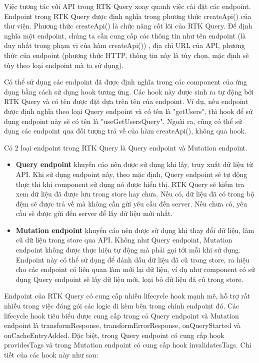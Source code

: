 \tab \tab Việc tương tác với API trong RTK Query xoay quanh việc cài đặt các endpoint.
Endpoint trong RTK Query được định nghĩa trong phương thức createApi() của thư viện.
Phương thức createApi() là chức năng cốt lõi của RTK Query.
Để định nghĩa một endpoint, chúng ta cần cung cấp các thông tin như tên endpoint (là duy nhất trong phạm vi của hàm createApi()) , địa chỉ URL của API, phương thức của endpoint (phương thức HTTP, thông tin này là tùy chọn, mặc định sẽ tùy theo loại endpoint mà ta sử dụng).

Có thể sử dụng các endpoint đã được định nghĩa trong các component của ứng dụng bằng cách sử dụng hook tương ứng.
Các hook này được sinh ra tự động bởi RTK Query và có tên được đặt dựa trên tên của endpoint.
Ví dụ, nếu endpoint được định nghĩa theo loại Query endpoint và có tên là "getUsers", thì hook để sử dụng endpoint này sẽ có tên là "useGetUsersQuery".
Ngoài ra, cũng có thể sử dụng các endpoint  qua đối tượng trả về của hàm createApi(), không qua hook.

Có 2 loại endpoint trong RTK Query là Query endpoint và Mutation endpoint.

\begin{itemize}
      \item \textbf{Query endpoint} khuyến cáo nên được sử dụng khi lấy, truy xuất dữ liệu từ API.
            Khi sử dụng endpoint này, theo mặc định, Query endpoint sẽ tự động thực thi khi component sử dụng nó được hiển thị.
            RTK Query sẽ kiểm tra xem dữ liệu đã được lưu trong store hay chưa.
            Nếu có, dữ liệu đã có trong bộ đệm sẽ được trả về mà không cần gửi yêu cầu đến server.
            Nếu chưa có, yêu cầu sẽ được gửi đến server để lấy dữ liệu mới nhất.
      \item \textbf{Mutation endpoint} khuyến cáo nên được sử dụng khi thay đổi dữ liệu, làm cũ dữ liệu trong store qua API.
            Không như Query endpoint, Mutation endpoint không được thực hiện tự động mà phải gọi tới mỗi khi sử dụng.
            Endpoint này có thể sử dụng để đánh dấu dữ liệu đã cũ trong store, ra hiệu cho các endpoint có liên quan làm mới lại dữ liệu, ví dụ như component có sử dụng Query endpoint sẽ lấy dữ liệu mới, loại bỏ dữ liệu đã cũ trong store.
\end{itemize}

\tab \tab Endpoint của RTK Query có cung cấp nhiều lifecycle hook mạnh mẽ, hỗ trợ rất nhiều trong việc đóng gói các logic đi kèm bên trong chính endpoint đó.
Các lifecycle hook tiêu biểu được cung cấp trong cả Query endpoint và Mutation endpoint là transformResponse,  transformErrorResponse, onQueryStarted và onCacheEntryAdded.
Đặc biệt, trong Query endpoint có cung cấp hook providesTags và trong Mutation endpoint có cung cấp hook invalidatesTags.
Chi tiết của các hook này như sau:

